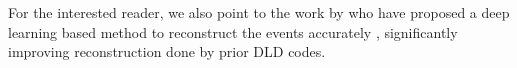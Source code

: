 For the interested reader, we also point to the work by \citeauthor{knipferDeepLearningbasedSpatiotemporal2024} who have proposed a deep learning based method to reconstruct the events accurately \cite{knipferDeepLearningbasedSpatiotemporal2024}, significantly improving reconstruction done by prior \gls{DLD} codes.